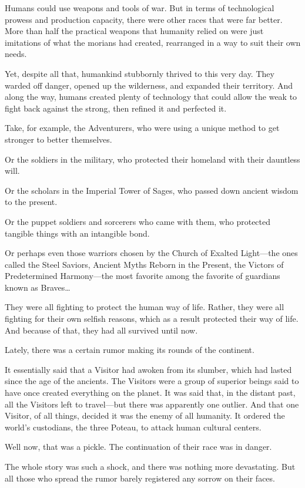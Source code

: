 Humans could use weapons and tools of war. But in terms of technological prowess and production capacity, there were other races that were far better. More than half the practical weapons that humanity relied on were just imitations of what the morians had created, rearranged in a way to suit their own needs.

Yet, despite all that, humankind stubbornly thrived to this very day. They warded off danger, opened up the wilderness, and expanded their territory. And along the way, humans created plenty of technology that could allow the weak to fight back against the strong, then refined it and perfected it.

Take, for example, the Adventurers, who were using a unique method to get stronger to better themselves.

Or the soldiers in the military, who protected their homeland with their dauntless will.

Or the scholars in the Imperial Tower of Sages, who passed down ancient wisdom to the present.

Or the puppet soldiers and sorcerers who came with them, who protected tangible things with an intangible bond.

Or perhaps even those warriors chosen by the Church of Exalted Light—the ones called the Steel Saviors, Ancient Myths Reborn in the Present, the Victors of Predetermined Harmony—the most favorite among the favorite of guardians known as Braves…

They were all fighting to protect the human way of life. Rather, they were all fighting for their own selfish reasons, which as a result protected their way of life. And because of that, they had all survived until now.

Lately, there was a certain rumor making its rounds of the continent.

It essentially said that a Visitor had awoken from its slumber, which had lasted since the age of the ancients. The Visitors were a group of superior beings said to have once created everything on the planet. It was said that, in the distant past, all the Visitors left to travel—but there was apparently one outlier. And that one Visitor, of all things, decided it was the enemy of all humanity. It ordered the world’s custodians, the three Poteau, to attack human cultural centers.

Well now, that was a pickle. The continuation of their race was in danger.

The whole story was such a shock, and there was nothing more devastating. But all those who spread the rumor barely registered any sorrow on their faces.

